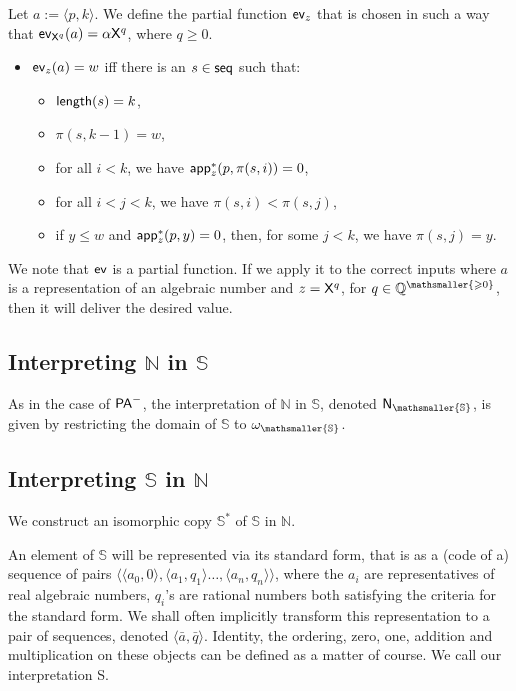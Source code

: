 \documentclass{amsart}
\renewcommand{\leq}{\leqslant}
\renewcommand{\geq}{\geqslant}
\newcommand{\tupel}[1]{{\langle #1 \rangle}}
\newcommand{\pam}{\ensuremath{{\sf PA}^{-}}}
\newcommand{\X}{{\sf X}}
\newcommand{\mbbs}[1]{\ensuremath{\mathsmaller{\mathbb{#1}}}}
\begin{document}
Let $a := \tupel{p,k}$. We define the partial function ${\sf ev}_z$ that is chosen in such a way that
${\sf ev}_{\X^q}(a)= \alpha\X^q$, where $q\geq 0$.
\begin{itemize}
    \item 
    ${\sf ev}_{z}(a) = w$ iff there is an $s\in {\sf seq}$ such that:
    \begin{itemize}
    \item
    ${\sf length}(s)=k$,
        \item 
    $\pi(s,k-1) = w$,
    \item 
    for all $i<k$, we have ${\sf app}^\ast_{z}(p,\pi(s,i)) =0 $,
    \item
    for all $i<j<k$, we have $\pi(s,i) < \pi(s,j)$,
    \item 
    if $y \leq w$ and 
    ${\sf app}^\ast_{z}(p,y) =0$, then, for some  $j<k$, we have $\pi(s,j)= y$.
    \end{itemize}
\end{itemize}
We note that ${\sf ev}$ is a partial function. If we apply it to the correct inputs where $a$ is
a representation of an algebraic number and $z=\X^q$, for $q\in \mathbb Q^{\mathsmaller{\geq 0}}$, then it will
deliver the desired value.

\subsection{Interpreting $\mathbb N$ in $\mathbb S$}
As in the case of $\pam$, the interpretation of $\mathbb{N}$ in $\mathbb{S}$, denoted ${\sf N_{\mbbs{S}}}$, 
is given by restricting the domain of $\mathbb{S}$ to $\omega_{\mbbs{S}}$. 

\subsection{Interpreting $\mathbb S$ in $\mathbb N$}
We construct an isomorphic copy $\mathbb S^\ast$ of $\mathbb S$ in $\mathbb N$.

An element of $\mathbb{S}$ will be represented via its standard form, that is as a (code of a) sequence of pairs
$\langle \tupel{a_0,0},\tupel{a_1,q_1}\ldots, \tupel{a_n,q_n}\rangle$, where the $a_i$ are representatives of real algebraic numbers, $q_i$'s are rational numbers both satisfying the criteria for the standard form. We shall often implicitly transform this representation to a pair of sequences, denoted $\tupel{\bar{a},\bar{q}}$.
Identity, the ordering, zero, one, addition and multiplication on these objects can be defined as a matter of course.  We call our interpretation {\sf S}.
\end{document}

